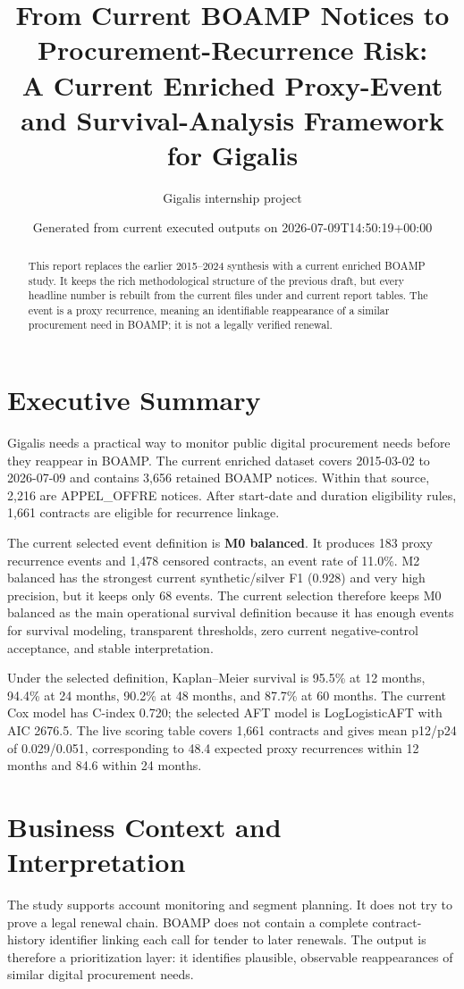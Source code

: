\documentclass[11pt,a4paper]{article}
\title{From Current BOAMP Notices to Procurement-Recurrence Risk:\\A Current Enriched Proxy-Event and Survival-Analysis Framework for Gigalis}
\author{Gigalis internship project}
\date{Generated from current executed outputs on 2026-07-09T14:50:19+00:00}
\begin{document}
\maketitle

\begin{abstract}
This report replaces the earlier 2015--2024 synthesis with a current enriched BOAMP study. It keeps the rich methodological structure of the previous draft, but every headline number is rebuilt from the current files under \protect{} and current report tables. The event is a proxy recurrence, meaning an identifiable reappearance of a similar procurement need in BOAMP; it is not a legally verified renewal.
\end{abstract}

\tableofcontents
\clearpage

\section{Executive Summary}
Gigalis needs a practical way to monitor public digital procurement needs before they reappear in BOAMP. The current enriched dataset covers 2015-03-02 to 2026-07-09 and contains 3,656 retained BOAMP notices. Within that source, 2,216 are APPEL\_OFFRE notices. After start-date and duration eligibility rules, 1,661 contracts are eligible for recurrence linkage.

The current selected event definition is \textbf{M0 balanced}. It produces 183 proxy recurrence events and 1,478 censored contracts, an event rate of 11.0\%. M2 balanced has the strongest current synthetic/silver F1 (0.928) and very high precision, but it keeps only 68 events. The current selection therefore keeps M0 balanced as the main operational survival definition because it has enough events for survival modeling, transparent thresholds, zero current negative-control acceptance, and stable interpretation.

Under the selected definition, Kaplan--Meier survival is 95.5\% at 12 months, 94.4\% at 24 months, 90.2\% at 48 months, and 87.7\% at 60 months. The current Cox model has C-index 0.720; the selected AFT model is LogLogisticAFT with AIC 2676.5. The live scoring table covers 1,661 contracts and gives mean p12/p24 of 0.029/0.051, corresponding to 48.4 expected proxy recurrences within 12 months and 84.6 within 24 months.

\section{Business Context and Interpretation}
The study supports account monitoring and segment planning. It does not try to prove a legal renewal chain. BOAMP does not contain a complete contract-history identifier linking each call for tender to later renewals. The output is therefore a prioritization layer: it identifies plausible, observable reappearances of similar digital procurement needs.
\end{document}
